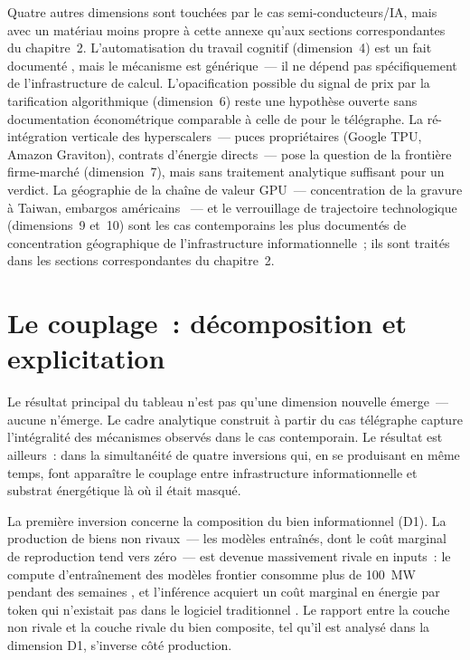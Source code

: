 Quatre autres dimensions sont touchées par le cas semi-conducteurs/IA, mais avec un matériau moins propre à cette annexe qu'aux sections correspondantes du chapitre~2. L'automatisation du travail cognitif (dimension~4) est un fait documenté \parencite{acemoglu_simple_2024}, mais le mécanisme est générique~--- il ne dépend pas spécifiquement de l'infrastructure de calcul. L'opacification possible du signal de prix par la tarification algorithmique (dimension~6) reste une hypothèse ouverte sans documentation économétrique comparable à celle de \textcite{steinwender_real_2018} pour le télégraphe. La ré-intégration verticale des hyperscalers~--- puces propriétaires (Google TPU, Amazon Graviton), contrats d'énergie directs~--- pose la question de la frontière firme-marché (dimension~7), mais sans traitement analytique suffisant pour un verdict. La géographie de la chaîne de valeur GPU~--- concentration de la gravure à Taiwan, embargos américains \parencite{miller_chip_2022}~--- et le verrouillage de trajectoire technologique (dimensions~9 et~10) sont les cas contemporains les plus documentés de concentration géographique de l'infrastructure informationnelle~; ils sont traités dans les sections correspondantes du chapitre~2.

\section{Le couplage~: décomposition et explicitation}

Le résultat principal du tableau n'est pas qu'une dimension nouvelle émerge~--- aucune n'émerge. Le cadre analytique construit à partir du cas télégraphe capture l'intégralité des mécanismes observés dans le cas contemporain. Le résultat est ailleurs~: dans la simultanéité de quatre inversions qui, en se produisant en même temps, font apparaître le couplage entre infrastructure informationnelle et substrat énergétique là où il était masqué.

La première inversion concerne la composition du bien informationnel (D1). La production de biens non rivaux~--- les modèles entraînés, dont le coût marginal de reproduction tend vers zéro~--- est devenue massivement rivale en inputs~: le compute d'entraînement des modèles frontier consomme plus de 100~MW pendant des semaines \parencite{epoch_electricity_2025}, et l'inférence acquiert un coût marginal en énergie par token qui n'existait pas dans le logiciel traditionnel \parencite{cottier_rapid_2025}. Le rapport entre la couche non rivale et la couche rivale du bien composite, tel qu'il est analysé dans la dimension D1, s'inverse côté production.

